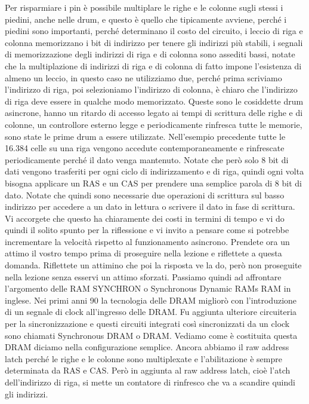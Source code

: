 Per risparmiare i pin è possibile multiplare le righe e le colonne sugli stessi i piedini, anche nelle drum, e questo è quello che tipicamente avviene, perché i piedini sono importanti, perché determinano il costo del circuito, i leccio di riga e colonna memorizzano i bit di indirizzo per tenere gli indirizzi più stabili, i segnali di memorizzazione degli indirizzi di riga e di colonna sono assediti bassi, notate che la multiplazione di indirizzi di riga e di colonna di fatto impone l'esistenza di almeno un leccio, in questo caso ne utilizziamo due, perché prima scriviamo l'indirizzo di riga, poi selezioniamo l'indirizzo di colonna, è chiaro che l'indirizzo di riga deve essere in qualche modo memorizzato.
Queste sono le cosiddette drum asincrone, hanno un ritardo di accesso legato ai tempi di scrittura delle righe e di colonne, un controllore esterno legge e periodicamente rinfresca tutte le memorie, sono state le prime drum a essere utilizzate.
Nell'esempio precedente tutte le 16.384 celle su una riga vengono accedute contemporaneamente e rinfrescate periodicamente perché il dato venga mantenuto.
Notate che però solo 8 bit di dati vengono trasferiti per ogni ciclo di indirizzamento e di riga, quindi ogni volta bisogna applicare un RAS e un CAS per prendere una semplice parola di 8 bit di dato.
Notate che quindi sono necessarie due operazioni di scrittura sul basso indirizzo per accedere a un dato in lettura o scrivere il dato in fase di scrittura.
Vi accorgete che questo ha chiaramente dei costi in termini di tempo e vi do quindi il solito spunto per la riflessione e vi invito a pensare come si potrebbe incrementare la velocità rispetto al funzionamento asincrono.
Prendete ora un attimo il vostro tempo prima di proseguire nella lezione e riflettete a questa domanda.
Riflettete un attimino che poi la risposta ve la do, però non proseguite nella lezione senza esservi un attimo sforzati.
Passiamo quindi ad affrontare l'argomento delle RAM SYNCHRON o Synchronous Dynamic RAMs RAM in inglese.
Nei primi anni 90 la tecnologia delle DRAM migliorò con l'introduzione di un segnale di clock all'ingresso delle DRAM.
Fu aggiunta ulteriore circuiteria per la sincronizzazione e questi circuiti integrati così sincronizzati da un clock sono chiamati Synchronous DRAM o DRAM.
Vediamo come è costituita questa DRAM diciamo nella configurazione semplice.
Ancora abbiamo il raw address latch perché le righe e le colonne sono multiplexate e l'abilitazione è sempre determinata da RAS e CAS.
Però in aggiunta al raw address latch, cioè l'atch dell'indirizzo di riga, si mette un contatore di rinfresco che va a scandire quindi gli indirizzi.
